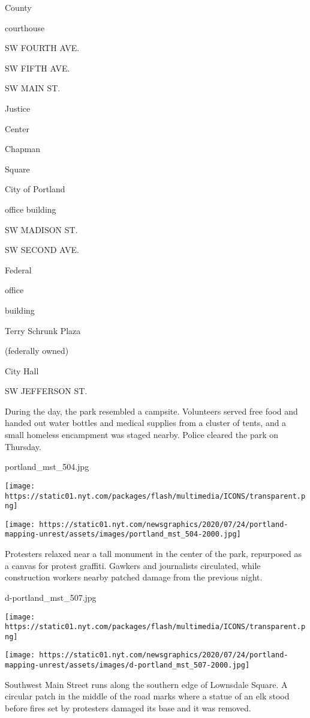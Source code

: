 County

courthouse

SW FOURTH AVE.

SW FIFTH AVE.

SW MAIN ST.

Justice

Center

Chapman

Square

City of Portland

office building

SW MADISON ST.

SW SECOND AVE.

Federal

office

building

Terry Schrunk Plaza

(federally owned)

City Hall

SW JEFFERSON ST.

During the day, the park resembled a campsite. Volunteers served free
food and handed out water bottles and medical supplies from a cluster of
tents, and a small homeless encampment was staged nearby. Police cleared
the park on Thursday.

portland\_mst\_504.jpg

\texttt{[image: https://static01.nyt.com/packages/flash/multimedia/ICONS/transparent.png]}

\texttt{[image: https://static01.nyt.com/newsgraphics/2020/07/24/portland-mapping-unrest/assets/images/portland\_mst\_504-2000.jpg]}

Protesters relaxed near a tall monument in the center of the park,
repurposed as a canvas for protest graffiti. Gawkers and journalists
circulated, while construction workers nearby patched damage from the
previous night.

d-portland\_mst\_507.jpg

\texttt{[image: https://static01.nyt.com/packages/flash/multimedia/ICONS/transparent.png]}

\texttt{[image: https://static01.nyt.com/newsgraphics/2020/07/24/portland-mapping-unrest/assets/images/d-portland\_mst\_507-2000.jpg]}

Southwest Main Street runs along the southern edge of Lownsdale Square.
A circular patch in the middle of the road marks where a statue of an
elk stood before fires set by protesters damaged its base and it was
removed.

